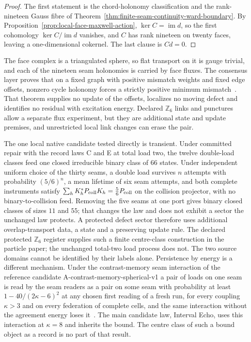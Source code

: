 \documentclass[11pt]{article}
\theoremstyle{remark}
\theoremstyle{plain}
\begin{document}
\begin{proof}
The first statement is the chord-holonomy classification and the
rank-nineteen Gauss fibre of
Theorem~\ref{thm:finite-seam-continuity-ward-boundary}. By
Proposition~\ref{prop:local-face-maxwell-action}, \(\ker C=\operatorname{im}d\),
so the first cohomology \(\ker C/\operatorname{im}d\) vanishes, and \(C\) has
rank nineteen on twenty faces, leaving a one-dimensional cokernel. The last
clause is \(Cd=0\).
\end{proof}

The face complex is a triangulated sphere, so flat transport on it is gauge
trivial, and each of the nineteen seam holonomies is carried by face fluxes. The consensus layer
proves that on a fixed graph with positive mismatch weights and fixed edge
offsets, nonzero cycle holonomy forces a strictly positive minimum
mismatch~\cite{ophconsensus}. That theorem supplies no update of the offsets,
localizes no moving defect and identifies no residual with excitation energy.
Declared \(\mathbb Z_6\) links and punctures allow a separate flux experiment,
but they are additional state and update premises, and unrestricted local
link changes can erase the pair.

The one local native candidate tested directly is transient. Under
committed repair with the record laws C and E at total load two, the twelve double-load classes
feed one closed irreducible binary class of \(66\) states. Under independent
uniform choice of the thirty seams, a double load survives \(n\) attempts with
probability \((5/6)^n\), a mean lifetime of six seam attempts, and both
complete instruments satisfy
\(\sum_hK_h^*P_{\rm coll}K_h=\tfrac56P_{\rm coll}\) on the collision projector,
with no binary-to-collision feed. Removing the five seams at one port gives
binary closed classes of sizes \(11\) and \(55\); that changes the law and
does not exhibit a sector the unchanged law protects. A
protected defect sector therefore uses additional overlap-transport
data, a state and a preserving update rule. The declared protected
$\mathbb Z_6$ register supplies such a finite centre-class construction
in the particle paper; the unchanged total-two load process does not.
The two source domains cannot be identified by their labels alone.
Persistence by energy is a different mechanism. Under the contrast-memory
seam interaction of the reference candidate A-contrast-memory-spherical-v1
a pair of loads on one seam is read by the seam readers as a pair on some
seam with probability at least \(1-40/(2\kappa-6)^2\) at any chosen first reading of a fresh run, for every coupling \(\kappa>3\) and on every federation of complete cells, and
the same interaction without the agreement energy loses it~\cite{ophmodel}. The main
candidate law, Interval Echo, uses this interaction at \(\kappa=8\) and
inherits the bound. The centre class of such a bound object as a record is
no part of that result.
\end{document}
